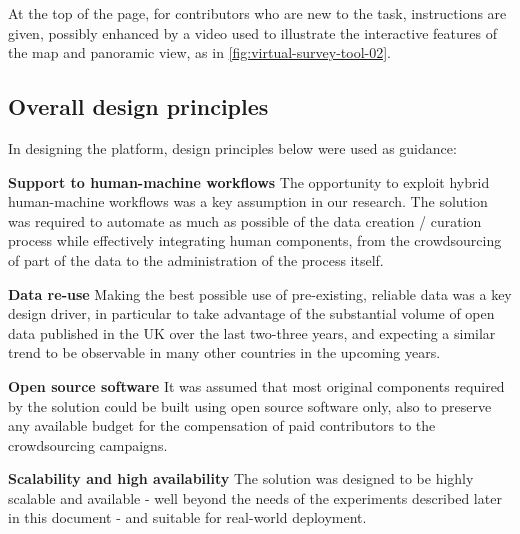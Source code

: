 At the top of the page, for contributors who are new to the task, instructions are given, possibly enhanced by a video used to illustrate the interactive features of the map and panoramic view, as in \ref{fig:virtual-survey-tool-02}.

\begin{figure}[!h]
    \begin{floatrow}
   \end{floatrow}
\end{figure}

\subsection{Overall design principles}

In designing the platform, design principles below were used as guidance:

\textbf{Support to human-machine workflows} The opportunity to exploit hybrid human-machine workflows was a key assumption in our research. The solution was required to automate as much as possible of the data creation / curation process while effectively integrating human components, from the crowdsourcing of part of the data to the administration of the process itself.

\textbf{Data re-use} Making the best possible use of pre-existing, reliable data was a key design driver, in particular to take advantage of the substantial volume of open data published in the UK over the last two-three years, and expecting a similar trend to be observable in many other countries in the upcoming years.

\textbf{Open source software} It was assumed that most original components required by the solution could be built using open source software only, also to preserve any available budget for the compensation of paid contributors to the crowdsourcing campaigns.

\textbf{Scalability and high availability} The solution was designed to be highly scalable and available - well beyond the needs of the experiments described later in this document - and suitable for real-world deployment.

